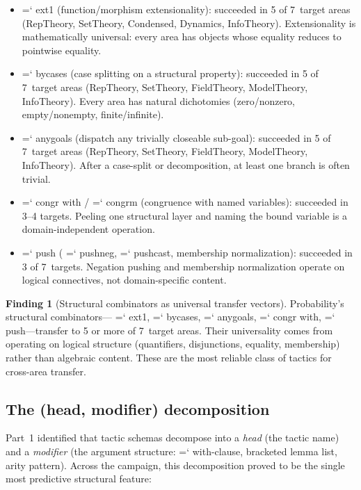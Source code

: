 \documentclass[11pt]{article}
\renewcommand{\texttt}[1]{%
  \begingroup\ttfamily\hyphenchar\font=`\-\relax
  \def\_{\textunderscore\discretionary{}{}{}}%
  #1\endgroup}
\theoremstyle{definition}
\newtheorem{finding}[theorem]{Finding}
\theoremstyle{remark}
\begin{document}
\begin{itemize}
\item \texttt{ext1} (function/morphism extensionality):
  succeeded in 5 of 7~target areas (RepTheory, SetTheory,
  Condensed, Dynamics, InfoTheory).  Extensionality is
  mathematically universal: every area has objects whose equality
  reduces to pointwise equality.

\item \texttt{by\_cases} (case splitting on a structural property):
  succeeded in 5 of 7~target areas (RepTheory, SetTheory,
  FieldTheory, ModelTheory, InfoTheory).  Every area has natural
  dichotomies (zero/nonzero, empty/nonempty, finite/infinite).

\item \texttt{any\_goals} (dispatch any trivially closeable
  sub-goal): succeeded in 5 of 7~target areas (RepTheory,
  SetTheory, FieldTheory, ModelTheory, InfoTheory).  After a
  case-split or decomposition, at least one branch is often trivial.

\item \texttt{congr with} / \texttt{congrm} (congruence with
  named variables): succeeded in 3--4 targets.  Peeling one
  structural layer and naming the bound variable is a
  domain-independent operation.

\item \texttt{push} (\texttt{push\_neg}, \texttt{push\_cast},
  membership normalization): succeeded in 3 of 7~targets.
  Negation pushing and membership normalization operate on
  logical connectives, not domain-specific content.
\end{itemize}

\begin{finding}[Structural combinators as universal transfer vectors]%
\label{find:structural}
Probability's structural combinators---\texttt{ext1},
\texttt{by\_cases}, \texttt{any\_goals}, \texttt{congr with},
\texttt{push}---transfer to 5 or more of 7~target areas.  Their
universality comes from operating on logical structure
(quantifiers, disjunctions, equality, membership) rather than
algebraic content.  These are the most reliable class of tactics
for cross-area transfer.
\end{finding}

\subsection{The (head, modifier) decomposition}

Part~1 identified that tactic schemas decompose into a
\emph{head} (the tactic name) and a \emph{modifier} (the argument
structure: \texttt{with}-clause, bracketed lemma list, arity
pattern).  Across the campaign, this decomposition proved to be the
single most predictive structural feature:
\end{document}
